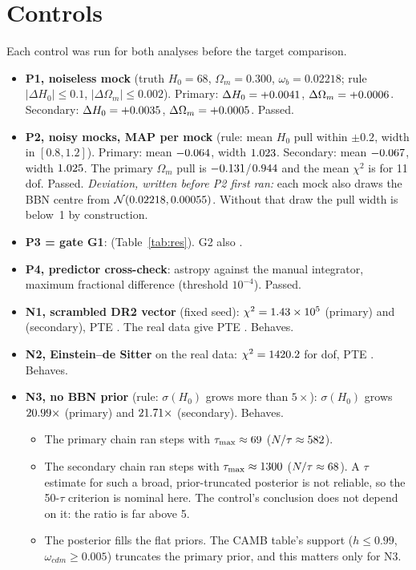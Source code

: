 \documentclass[11pt]{article}
\begin{document}
\section{Controls}

Each control was run for both analyses before the target comparison.

\begin{itemize}
\item \textbf{P1, noiseless mock} (truth $H_0=68$, $\Omega_m=0.300$,
  $\omega_b=0.02218$; rule $|\Delta H_0|\le0.1$, $|\Delta\Omega_m|\le0.002$).
  Primary: $\Delta H_0=+0.0041$, $\Delta\Omega_m=+0.0006$.
  Secondary: $\Delta H_0=+0.0035$, $\Delta\Omega_m=+0.0005$.
  Passed.
\item \textbf{P2, \PTwoN{} noisy mocks, MAP per mock} (rule: mean $H_0$
  pull within $\pm0.2$, width in $[0.8,1.2]$). Primary: mean
  $-0.064$, width $1.023$. Secondary: mean $-0.067$, width
  $1.025$. The primary $\Omega_m$ pull is $-0.131$/$0.944$
  and the mean $\chi^2$ is \PTwoChiP{} for 11 dof. Passed.
  \emph{Deviation, written before P2 first ran:} each mock also draws the
  BBN centre from $\mathcal{N}(0.02218,0.00055)$. Without that draw the
  pull width is below~1 by construction.
\item \textbf{P3 = gate G1}: \GOnePassed{} (Table~\ref{tab:res}).
  G2 also \GTwoPassed.
\item \textbf{P4, predictor cross-check}: astropy against the manual
  integrator, maximum fractional difference \PFour{} (threshold $10^{-4}$).
  Passed.
\item \textbf{N1, scrambled DR2 vector} (fixed seed): $\chi^2=1.43\times10^{5}$
  (primary) and \NOneChiS{} (secondary), PTE \NOnePte. The real data give
  PTE \NOneRealPte. Behaves.
\item \textbf{N2, Einstein--de Sitter} on the real data:
  $\chi^2=1420.2$ for \NTwoDof{} dof, PTE \NTwoPte. Behaves.
\item \textbf{N3, no BBN prior} (rule: $\sigma(H_0)$ grows more than
  $5\times$): $\sigma(H_0)$ grows $20.99\times$ (primary) and
  $21.71\times$ (secondary). Behaves.
  \begin{itemize}
  \item The primary chain ran \NThreeStepsP{} steps with
    $\tau_\mathrm{max}\approx69$ ($N/\tau\approx582$).
  \item The secondary chain ran \NThreeStepsS{} steps with
    $\tau_\mathrm{max}\approx1300$ ($N/\tau\approx68$).
    A $\tau$ estimate for such a broad, prior-truncated posterior is not
    reliable, so the 50-$\tau$ criterion is nominal here. The control's
    conclusion does not depend on it: the ratio is far above 5.
  \item The posterior fills the flat priors. The CAMB table's support
    ($h\le0.99$, $\omega_{cdm}\ge0.005$) truncates the primary prior, and
    this matters only for N3.
  \end{itemize}
\end{itemize}
\end{document}
